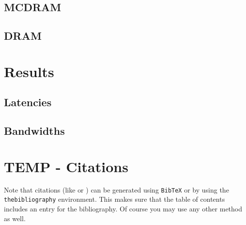 \documentclass[bsc,frontabs,twoside,singlespacing,parskip,deptreport]{infthesis}     %
\begin{document}
\section{MCDRAM}
\section{DRAM}
\newpage

\chapter{Results}
\section{Latencies}
\newpage
\section{Bandwidths}



\chapter{TEMP - Citations}

Note that citations 
(like \cite{P1} or \cite{P2})
can be generated using {\tt BibTeX} or by using the
{\tt thebibliography} environment. This makes sure that the
table of contents includes an entry for the bibliography.
Of course you may use any other method as well.



\end{document}
